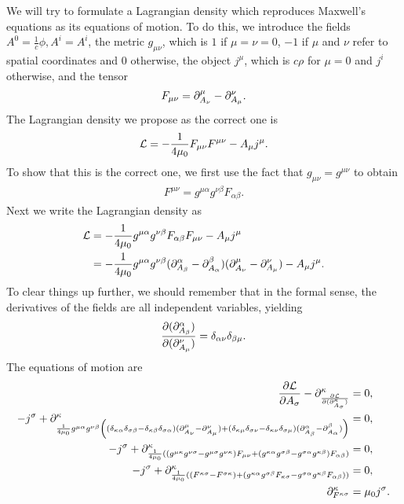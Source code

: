 We will try to formulate a Lagrangian density which reproduces Maxwell's equations as its equations of motion. To do this, we introduce the fields $A^{0} = \frac{1}{c}\phi, A^{i} = A^{i}$, the metric $g_{\mu\nu}$, which is $1$ if $\mu = \nu = 0$, $-1$ if $\mu$ and $\nu$ refer to spatial coordinates and $0$ otherwise, the object $j^{\mu}$, which is $c\rho$ for $\mu = 0$ and $j^{i}$ otherwise, and the tensor
\begin{align*}
	F_{\mu\nu} = \partial^{\mu}_{A_{\nu}} - \partial^{\nu}_{A_{\mu}}.
\end{align*}
The Lagrangian density we propose as the correct one is
\begin{align*}
	\mathcal{L} = -\frac{1}{4\mu_{0}}F_{\mu\nu}F^{\mu\nu} - A_{\mu}j^{\mu}.
\end{align*}
To show that this is the correct one, we first use the fact that $g_{\mu\nu} = g^{\mu\nu}$ to obtain
\begin{align*}
	F^{\mu\nu} = g^{\mu\alpha}g^{\nu\beta}F_{\alpha\beta}.
\end{align*}
Next we write the Lagrangian density as
\begin{align*}
	\mathcal{L} &= -\frac{1}{4\mu_{0}}g^{\mu\alpha}g^{\nu\beta}F_{\alpha\beta}F_{\mu\nu} - A_{\mu}j^{\mu} \\
	     &= -\frac{1}{4\mu_{0}}g^{\mu\alpha}g^{\nu\beta}(\partial^{\alpha}_{A_{\beta}} - \partial^{\beta}_{A_{\alpha}})(\partial^{\mu}_{A_{\nu}} - \partial^{\nu}_{A_{\mu}}) - A_{\mu}j^{\mu}.
\end{align*}
To clear things up further, we should remember that in the formal sense, the derivatives of the fields are all independent variables, yielding
\begin{align*}
	\pdv{(\ensuremath{\partial^{\alpha}_{A_{\beta}}})}{(\ensuremath{\partial^{\nu}_{A_{\mu}}})} = \delta_{\alpha\nu}\delta_{\beta\mu}.
\end{align*}
The equations of motion are
\begin{align*}
	\pdv{\ensuremath{\mathcal{L}}}{A_{\sigma}} - \partial^{\kappa}_{\pdv{\ensuremath{\mathcal{L}}}{(\ensuremath{\partial^{\kappa}_{A_{\sigma}}})}} &= 0, \\
	-j^{\sigma} + \partial^{\kappa}_{\frac{1}{4\mu_{0}}g^{\mu\alpha}g^{\nu\beta}\left((\delta_{\kappa\alpha}\delta_{\sigma\beta} - \delta_{\kappa\beta}\delta_{\sigma\alpha})(\partial^{\mu}_{A_{\nu}} - \partial^{\nu}_{A_{\mu}}) + (\delta_{\kappa\mu}\delta_{\sigma\nu} - \delta_{\kappa\nu}\delta_{\sigma\mu})(\partial^{\alpha}_{A_{\beta}} - \partial^{\beta}_{A_{\alpha}})\right)} &= 0, \\
	-j^{\sigma} + \partial^{\kappa}_{\frac{1}{4\mu_{0}}\left((g^{\mu\kappa}g^{\nu\sigma} - g^{\mu\sigma}g^{\nu\kappa})F_{\mu\nu} + (g^{\kappa\alpha}g^{\sigma\beta} - g^{\sigma\alpha}g^{\kappa\beta})F_{\alpha\beta}\right)} &= 0, \\
	-j^{\sigma} + \partial^{\kappa}_{\frac{1}{4\mu_{0}}\left((F^{\kappa\sigma} - F^{\sigma\kappa}) + (g^{\kappa\alpha}g^{\sigma\beta}F_{\kappa\sigma} - g^{\sigma\alpha}g^{\kappa\beta}F_{\alpha\beta})\right)} &= 0, \\
	\partial^{\kappa}_{F^{\kappa\sigma}} &= \mu_{0}j^{\sigma}.
\end{align*}

